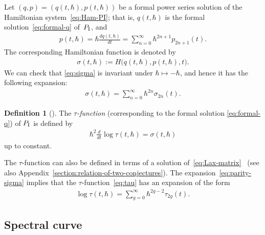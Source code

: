 \documentclass[pdftex]{sigma}
\theoremstyle{definition}
\newtheorem{Def}[thm]{Definition}
\numberwithin{equation}{section}
\def\PI{P_{\rm I}}
\begin{document}
Let $(q,p) = (q(t,\hbar), p(t,\hbar))$ be a formal power series
solution of the Hamiltonian system~\eqref{eq:Ham-PI}; that is,
$q(t,\hbar)$ is the formal solution~\eqref{eq:formal-q}
of~$\PI$, and
\begin{gather*} %
p(t,\hbar) = \hbar \frac{d q(t,\hbar)}{dt} =
\sum_{n=0}^{\infty} \hbar^{2n+1} p_{2n+1}(t).
\end{gather*}
The corresponding Hamiltonian function is denoted by
\begin{gather} \label{eq:sigma}
\sigma(t,\hbar) := H\big(q(t,\hbar), p(t,\hbar), t\big).
\end{gather}
We can check that \eqref{eq:sigma}
is invariant under $\hbar \mapsto - \hbar$, and hence
it has the following expansion:
\begin{gather} \label{eq:parity-sigma}
\sigma(t,\hbar) = \sum_{n=0}^{\infty} \hbar^{2n} \sigma_{2n}(t).
\end{gather}

\begin{Def} [\cite{JMU, Okamoto}] \label{def:tau-function}
The {\em $\tau$-function}
(corresponding to the formal solution \eqref{eq:formal-q})
of $\PI$ is def\/ined by
\begin{gather} \label{eq:tau}
\hbar^{2} \frac{d}{dt} \log \tau(t,\hbar) = \sigma(t,\hbar)
\end{gather}
up to constant.
\end{Def}

The $\tau$-function can also be def\/ined in terms of
a solution of~\eqref{eq:Lax-matrix}~\cite{JMU} (see also
Appendix~\ref{section:relation-of-two-conjectures}).
The expansion~\eqref{eq:parity-sigma} implies that the $\tau$-function~\eqref{eq:tau} has an expansion of the form
\begin{gather*} %
\log \tau(t,\hbar) = \sum_{g=0}^{\infty} \hbar^{2g-2} \tau_{2g}(t).
\end{gather*} %

\subsection{Spectral curve}
\end{document}
